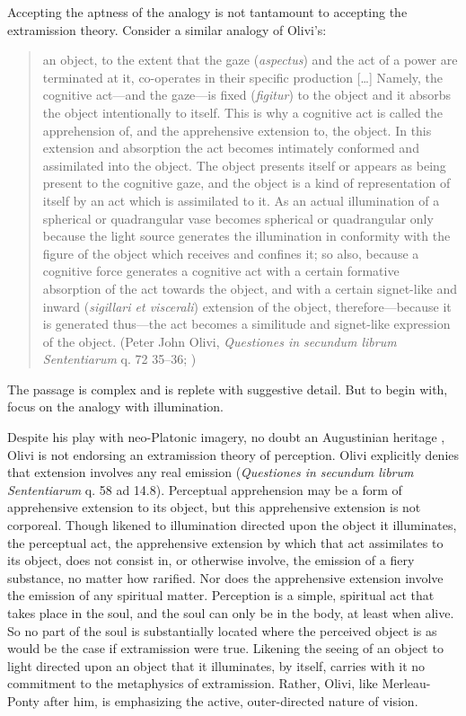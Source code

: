 Accepting the aptness of the analogy is not tantamount to accepting the extramission theory. Consider a similar analogy of Olivi's:
\begin{quote}
	an object, to the extent that the gaze (\emph{aspectus}) and the act of a power are terminated at it, co-operates in their specific production [\ldots] Namely, the cognitive act---and the gaze---is fixed (\emph{figitur}) to the object and it absorbs the object intentionally to itself. This is why a cognitive act is called the apprehension of, and the apprehensive extension to, the object. In this extension and absorption the act becomes intimately conformed and assimilated into the object. The object presents itself or appears as being present to the cognitive gaze, and the object is a kind of representation of itself by an act which is assimilated to it. As an actual illumination of a spherical or quadrangular vase becomes spherical or quadrangular only because the light source generates the illumination in conformity with the figure of the object which receives and confines it; so also, because a cognitive force generates a cognitive act with a certain formative absorption of the act towards the object, and with a certain signet-like and inward (\emph{sigillari et viscerali}) extension of the object, therefore---because it is generated thus---the act becomes a similitude and signet-like expression of the object. (Peter John Olivi, \emph{Questiones in secundum librum Sententiarum} q. 72 35--36; \citealt[146--147]{Toivanen:2013ul})
\end{quote}
The passage is complex and is replete with suggestive detail. But to begin with, focus on the analogy with illumination.

Despite his play with neo-Platonic imagery, no doubt an Augustinian heritage \citep[198]{Kent:1984zm}, Olivi is not endorsing an extramission theory of perception. Olivi explicitly denies that extension involves any real emission (\emph{Questiones in secundum librum Sententiarum} q. 58 ad 14.8). Perceptual apprehension may be a form of apprehensive extension to its object, but this apprehensive extension is not corporeal. Though likened to illumination directed upon the object it illuminates, the perceptual act, the apprehensive extension by which that act assimilates to its object, does not consist in, or otherwise involve, the emission of a fiery substance, no matter how rarified. Nor does the apprehensive extension involve the emission of any spiritual matter. Perception is a simple, spiritual act that takes place in the soul, and the soul can only be in the body, at least when alive. So no part of the soul is substantially located where the perceived object is as would be the case if extramission were true. Likening the seeing of an object to light directed upon an object that it illuminates, by itself, carries with it no commitment to the metaphysics of extramission. Rather, Olivi, like Merleau-Ponty after him, is emphasizing the active, outer-directed nature of vision.

